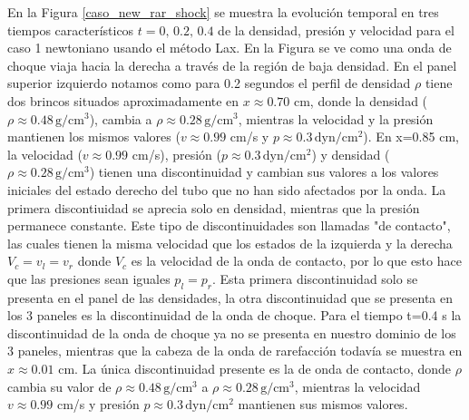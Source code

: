 \documentclass[12pt,a4paper]{book}
\begin{document}
En la Figura \ref{caso_new_rar_shock} se muestra la evolución temporal en tres 
tiempos característicos $t = 0, \, 0.2, \, 0.4$
de la densidad, 
presión y velocidad para el caso 1 newtoniano usando el método Lax. En la Figura se ve como 
una onda de choque viaja hacia la derecha a través de la región de baja densidad.
En el panel superior izquierdo
notamos como para 0.2 segundos el perfil de densidad $\rho$ tiene dos brincos situados 
aproximadamente en 
$x \approx 0.70$ cm, donde la densidad ($\rho \approx 0.48 \,  \text{g}/ \text{cm}^3$), 
cambia a $\rho \approx 0.28 \,  \text{g}/ \text{cm}^3$, mientras la velocidad y la presión 
mantienen los mismos valores 
($v \approx 0.99$ cm/s y $p \approx 0.3 \,  \text{dyn}/ \text{cm}^2 $).
En x=0.85 cm, la velocidad ($v \approx 0.99$ cm/s), presión 
($p \approx 0.3  \,  \text{dyn}/ \text{cm}^2 $)  y  densidad 
($\rho \approx 0.28 \,  \text{g}/ \text{cm}^3$) 
tienen una discontinuidad y cambian sus valores a los valores iniciales del estado derecho del tubo
que no han sido afectados por la onda. 
La primera discontiuidad se aprecia solo en densidad, mientras que la presión permanece constante. Este tipo de discontinuidades son llamadas "de contacto", las cuales tienen la misma velocidad
que los estados de la izquierda y la derecha $V_c = v_l = v_r$ donde $V_c$
es la velocidad de la onda de contacto, por lo que esto hace que las presiones sean iguales 
$p_l = p_r$. Esta primera discontinuidad solo se 
presenta en el panel de las densidades, la otra discontinuidad que se presenta en los 3 paneles es la 
discontinuidad de la onda de choque.
Para el tiempo t=0.4 s
la discontinuidad de la onda de choque ya no se presenta en nuestro dominio de los 3 paneles, mientras 
que la cabeza de la onda de rarefacción todavía se muestra en $x \approx 0.01$ cm. La única discontinuidad 
presente es la de onda de 
contacto, donde $\rho$ cambia su valor de $\rho \approx 0.48 \,  \text{g}/ \text{cm}^3$
a $\rho \approx 0.28 \,  \text{g}/ \text{cm}^3$, mientras la velocidad $v \approx 0.99$ cm/s y 
presión $p \approx 0.3 \,  \text{dyn}/ \text{cm}^2 $ mantienen
sus mismos valores.
\end{document}
